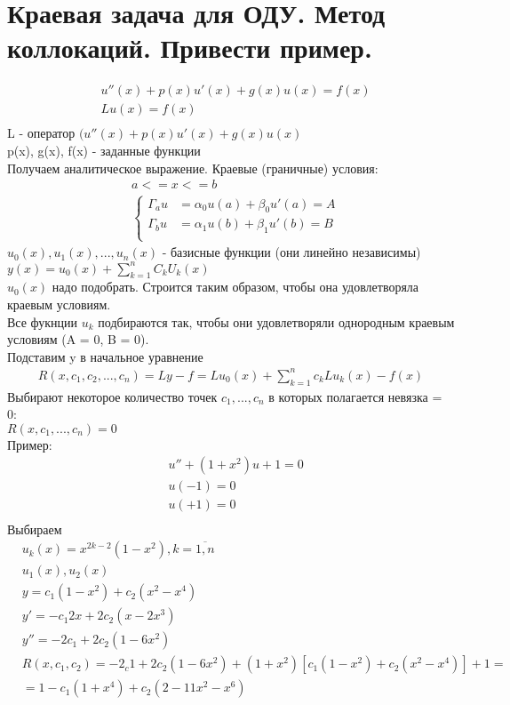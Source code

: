 \documentclass[12pt,a4paper]{article}
\begin{document}
	\section{Краевая задача для ОДУ. Метод коллокаций. Привести пример.}
	\begin{align*}
	&u''(x) + p(x) u'(x) + g(x)u(x) = f(x)\\
	&Lu(x) = f(x)\\	
	\end{align*}
	L - оператор $(u''(x) + p(x)u'(x) + g(x)u(x)$\\
	p(x), g(x), f(x) - заданные функции\\
	Получаем аналитическое выражение. Краевые (граничные) условия:\\
	\begin{align*}	
	&a <= x <= b\\
	&\begin{cases}
	\varGamma_a u &= \alpha_0 u(a) + \beta_0 u'(a) = A\\
	\varGamma_b u &= \alpha_1 u(b) + \beta_1 u'(b) = B\\
	\end{cases}
	\end{align*}
	$u_0(x), u_1(x), ..., u_n(x)$ - базисные функции (они линейно независимы)\\
	$y(x) = u_0(x) + \sum_{k=1}^{n}C_k U_k(x)$\\
	$u_0(x)$ надо подобрать. Строится таким образом, чтобы она удовлетворяла краевым условиям.\\
	Все фукнции $u_k$ подбираются так, чтобы они удовлетворяли однородным краевым условиям (A = 0, B = 0).\\
	Подставим y в начальное уравнение \\
	\begin{align*}
	R(x, c_1, c_2, ..., c_n) = Ly - f = Lu_0(x) + \sum_{k=1}^{n}c_k L u_k(x) - f(x)
	\end{align*}
	Выбирают некоторое количество точек $c_1, ..., c_n$ в которых полагается невязка = 0:\\
	$R(x, c_1, ..., c_n) = 0$\\
	Пример:\\
	\begin{align*}
	&u'' + (1+x^2)u + 1 = 0\\
	&u(-1) = 0\\
	&u(+1) = 0\\
	\end{align*}
	Выбираем
	\begin{align*}
	&u_k(x) = x^{2k-2} (1 - x^2), k=\overline{1, n}\\
	&u_1(x), u_2(x)\\
	&y = c_1(1-x^2) + c_2(x^2 - x^4)\\
	&y'= -c_1 2x + 2c_2 (x - 2x^3)\\
	&y'' = -2c_1 + 2c_2 (1 - 6x^2)\\
	&R(x, c_1, c_2)  = -2_c1 + 2c_2 ( 1 - 6x^2) + (1+x^2) \left[ c_1(1-x^2) + c_2(x^2 - x^4) \right] + 1 = \\
	&= 1 - c_1(1+x^4) + c_2(2-11x^2-x^6)\\
	\end{align*}
\end{document}
